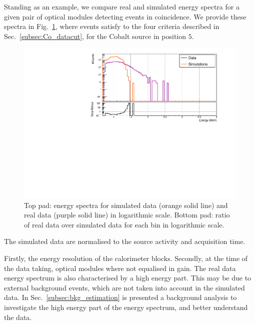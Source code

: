 Standing as an example, we compare real and simulated energy spectra for a given pair of optical modules detecting events in coincidence.
We provide these spectra in Fig.~\ref{fig:detector_efficiency}, where events satisfy to the four criteria described in Sec.~\ref{subsec:Co_datacut}, for the Cobalt source in position $5$.
\begin{figure}[h]
  \centering
  \includegraphics[width=17cm]{commissioning/fig_commissioning/Co_efficiency_detector.pdf}
  \caption{Top pad: energy spectra for simulated data (orange solid line) and real data (purple solid line) in logarithmic scale.
    Bottom pad: ratio of real data over simulated data for each bin in logarithmic scale.
    \label{fig:detector_efficiency}}
\end{figure}
The simulated data are normalised to the source activity and acquisition time.


Firstly, the energy resolution of the calorimeter blocks.
Secondly, at the time of the data taking, optical modules where not equalised in gain.
The real data energy spectrum is also characterised by a high energy part.
This may be due to external background events, which are not taken into account in the simulated data.
In Sec.~\ref{subsec:bkg_estimation} is presented a background analysis to investigate the high energy part of the energy spectrum, and better understand the data.





